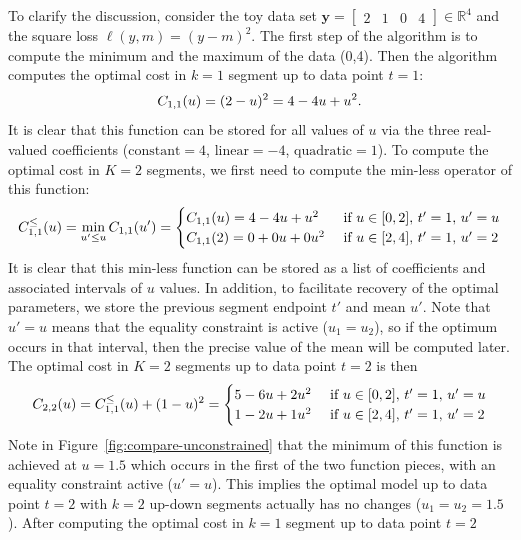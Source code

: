 \documentclass{article}
\newcommand{\RR}{\mathbb R}
\begin{document}
To clarify the discussion, consider the 
toy data set $\mathbf y= \left[
\begin{array}{cccccc}
  2 & 1 & 0 & 4
\end{array}
\right] \in\RR^4$ and the square loss $\ell(y,m)=(y-m)^2$. The first
step of the algorithm is to compute the minimum and the maximum of the
data (0,4). Then the algorithm computes the optimal cost in $k=1$
segment up to data point $t=1$:
\begin{equation}
  C_{1,1}(u) = (2-u)^2=4 - 4u + u^2.
\end{equation}
It is clear that this function can be stored for all values of $u$ via
the three real-valued coefficients ($\text{constant}=4$,
$\text{linear}=-4$, $\text{quadratic}=1$). To compute the optimal cost
in $K=2$ segments, we first need to compute the min-less operator of
this function:
\begin{equation}
  C_{1,1}^\leq(u) =\min_{u'\leq u}C_{1,1}(u')=
  \begin{cases}
    C_{1,1}(u) = 4 - 4u + u^2 &\text{ if }u\in[0,2],\, t'=1,\, u'=u\\
    C_{1,1}(2) = 0 + 0u + 0u^2 & \text{ if }u\in[2,4],\, t'=1,\, u'=2
  \end{cases}
\end{equation}
It is clear that this min-less function can be stored as a list of
coefficients and associated intervals of $u$ values. In addition, to
facilitate recovery of the optimal parameters, we store the previous
segment endpoint $t'$ and mean $u'$. Note that $u'=u$ means that the
equality constraint is active ($u_1=u_2$), so if the optimum occurs in that
interval, then the precise value of the mean will be computed
later. The optimal cost in $K=2$ segments up to data point $t=2$ is
then
\begin{equation}
  C_{2,2}(u) = C_{1,1}^\leq(u)+(1-u)^2 = 
  \begin{cases}
    5 - 6u + 2u^2 &\text{ if }u\in[0,2],\, t'=1,\, u'=u\\
    1 - 2u + 1u^2 &\text{ if }u\in[2,4],\, t'=1,\, u'=2
  \end{cases}
\end{equation}
Note in Figure~\ref{fig:compare-unconstrained} that the minimum of
this function is achieved at $u=1.5$ which occurs in the first of the
two function pieces, with an equality constraint active ($u'=u$). This
implies the optimal model up to data point $t=2$ with $k=2$ up-down
segments actually has no changes ($u_1=u_2=1.5$). After computing the
optimal cost in $k=1$ segment up to data point $t=2$
\end{document}
